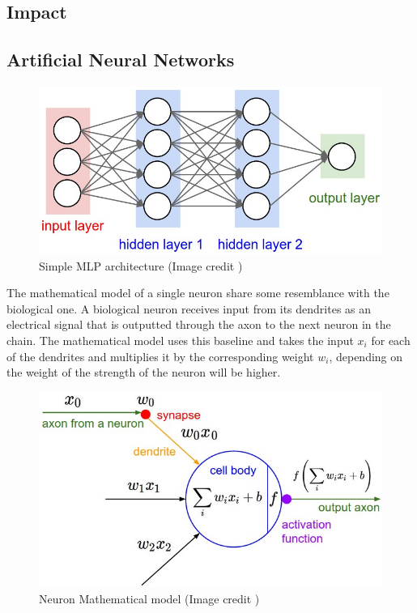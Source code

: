 \subsection{Impact}
\newpage

\subsection{Artificial Neural Networks}
\begin{figure}[th]
    \centering
    \includegraphics{Figures/NeuralNet}
    \decoRule
    \caption[Simple MLP architecture]{Simple MLP architecture (Image credit \cite{cs231n})}
    \label{fig:MLP}
\end{figure}

The mathematical model of a single neuron share some resemblance with the biological one.
A biological neuron receives input from its dendrites as an electrical signal that is outputted through the axon to the next neuron in the chain.
The mathematical model uses this baseline and takes the input $x_i$ for each of the dendrites and multiplies it by the corresponding weight $w_i$,
depending on the weight of the strength of the neuron will be higher. 

\begin{figure}[th]
    \centering
    \includegraphics{Figures/Neuron}
    \decoRule
    \caption[Simple MLP architecture]{Neuron Mathematical model (Image credit \cite{cs231n})}
    \label{fig:MLP}
\end{figure}

